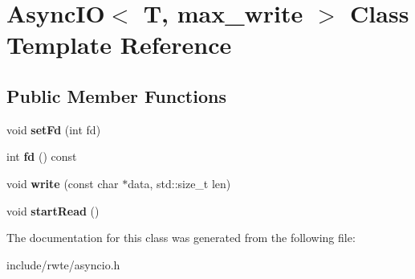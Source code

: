 \hypertarget{classAsyncIO}{}\section{Async\+IO$<$ T, max\+\_\+write $>$ Class Template Reference}
\label{classAsyncIO}
\subsection*{Public Member Functions}
\begin{DoxyCompactItemize}
\item 
\mbox{\label{classAsyncIO_ac67212a073d95d49ceb7a8d6221ce437}} 
void {\bfseries set\+Fd} (int fd)
\item 
\mbox{\label{classAsyncIO_a32a69a2acf7df79a90b737421cffba95}} 
int {\bfseries fd} () const
\item 
\mbox{\label{classAsyncIO_a61a88b6efc28d99159add231f0987fc7}} 
void {\bfseries write} (const char $\ast$data, std\+::size\+\_\+t len)
\item 
\mbox{\label{classAsyncIO_aff5543d4524f643f3f10b9c3049e8a0b}} 
void {\bfseries start\+Read} ()
\end{DoxyCompactItemize}


The documentation for this class was generated from the following file\+:\begin{DoxyCompactItemize}
\item 
include/rwte/asyncio.\+h\end{DoxyCompactItemize}
